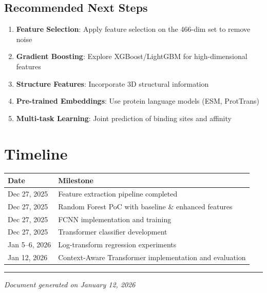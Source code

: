 \documentclass[11pt,a4paper]{article}
\begin{document}
\subsection{Recommended Next Steps}
\begin{enumerate}
    \item \textbf{Feature Selection}: Apply feature selection on the 466-dim set to remove noise
    \item \textbf{Gradient Boosting}: Explore XGBoost/LightGBM for high-dimensional features
    \item \textbf{Structure Features}: Incorporate 3D structural information
    \item \textbf{Pre-trained Embeddings}: Use protein language models (ESM, ProtTrans)
    \item \textbf{Multi-task Learning}: Joint prediction of binding sites and affinity
\end{enumerate}

\section{Timeline}

\begin{tabular}{@{}ll@{}}
\toprule
\textbf{Date} & \textbf{Milestone} \\ \midrule
Dec 27, 2025 & Feature extraction pipeline completed \\
Dec 27, 2025 & Random Forest PoC with baseline \& enhanced features \\
Dec 27, 2025 & FCNN implementation and training \\
Dec 27, 2025 & Transformer classifier development \\
Jan 5--6, 2026 & Log-transform regression experiments \\
Jan 12, 2026 & Context-Aware Transformer implementation and evaluation \\ \bottomrule
\end{tabular}

\vspace{2em}
\hrule
\vspace{1em}
\textit{Document generated on January 12, 2026}
\end{document}
